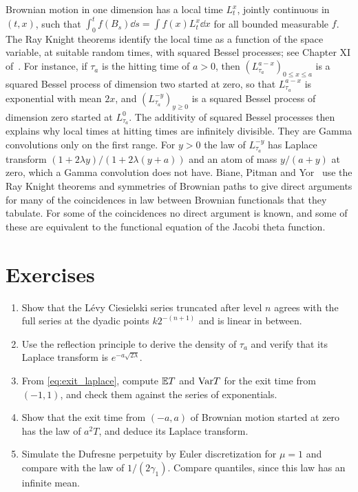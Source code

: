 Brownian motion in one dimension has a local time $L_t^x$, jointly continuous in $(t,x)$, such that $\int_0^tf(B_s)\dd s = \int f(x)L^x_t\dd x$ for all bounded measurable $f$. The Ray Knight theorems identify the local time as a function of the space variable, at suitable random times, with squared Bessel processes; see Chapter XI of~\cite{revuzyor}. For instance, if $\tau_a$ is the hitting time of $a>0$, then $(L^{a-x}_{\tau_a})_{0\leq x\leq a}$ is a squared Bessel process of dimension two started at zero, so that $L^{a-x}_{\tau_a}$ is exponential with mean $2x$, and $(L^{-y}_{\tau_a})_{y\geq0}$ is a squared Bessel process of dimension zero started at $L^0_{\tau_a}$. The additivity of squared Bessel processes then explains why local times at hitting times are infinitely divisible. They are Gamma convolutions only on the first range. For $y>0$ the law of $L^{-y}_{\tau_a}$ has Laplace transform $(1+2\lambda y)/(1+2\lambda(y+a))$ and an atom of mass $y/(a+y)$ at zero, which a Gamma convolution does not have. Biane, Pitman and Yor~\cite{bpy2001} use the Ray Knight theorems and symmetries of Brownian paths to give direct arguments for many of the coincidences in law between Brownian functionals that they tabulate. For some of the coincidences no direct argument is known, and some of these are equivalent to the functional equation of the Jacobi theta function.

\section*{Exercises}
\begin{enumerate}
\item Show that the L\'evy Ciesielski series truncated after level $n$ agrees with the full series at the dyadic points $k2^{-(n+1)}$ and is linear in between.
\item Use the reflection principle to derive the density of $\tau_a$ and verify that its Laplace transform is $e^{-a\sqrt{2\lambda}}$.
\item From \eqref{eq:exit_laplace}, compute $\mathbb{E} T$ and $\mathrm{Var} T$ for the exit time from $(-1,1)$, and check them against the series of exponentials.
\item Show that the exit time from $(-a,a)$ of Brownian motion started at zero has the law of $a^2T$, and deduce its Laplace transform.
\item Simulate the Dufresne perpetuity by Euler discretization for $\mu = 1$ and compare with the law of $1/(2\gamma_1)$. Compare quantiles, since this law has an infinite mean.
\end{enumerate}
